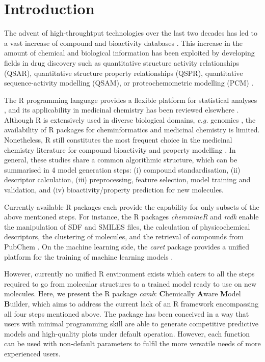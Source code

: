 \documentclass{bioinfo}
\begin{document}
\section{Introduction}

The advent of high-throughtput technologies over the last two decades 
has led to a vast increase of compound and bioactivity databases \citep{bender_databases,chembl,pubchem}.
This increase in the amount of chemical and biological information 
has been exploited by developing fields in drug discovery 
such as quantitative structure activity relationships (QSAR), quantitative structure property relationships (QSPR), quantitative sequence-activity modelling (QSAM), or proteochemometric modelling (PCM) \citep{review_pcm}.

The R programming language provides a flexible platform for statistical analyses \citep{Rlanguage},
and its applicability in medicinal chemistry has been reviewed elsewhere \citep{mente}.
Although R is extensively used in diverse biological domains, {\it e.g.} genomics \citep{bioconductor},
the availability of R packages for cheminformatics and medicinal chemistry is limited. %
Nonetheless, R still constitutes the most frequent choice in the medicinal chemistry literature
for compound bioactivity and property modelling \citep{mente}.
In general, these studies share a common algorithmic structure, which can be summarised in 4 model generation steps:
(i) compound standardisation, (ii) descriptor calculation,
(iii) preprocessing, feature selection, model training and validation, and (iv) bioactivity/property prediction for new molecules.

Currently available R packages each provide the capability for only subsets of the above mentioned steps.
For instance, the R packages {\it chemmineR} \citep{chemmineR} and {\it rcdk} \citep{rcdk} enable the manipulation of SDF and SMILES
files, the calculation of physicochemical descriptors, the clustering of molecules,
and the retrieval of compounds from PubChem \citep{pubchem}.
On the machine learning side, the {\it caret} package provides a
unified platform for the training of machine learning models \citep{caret}.

However, currently no unified R environment exists which caters to all the steps required to go from molecular structures to a trained model ready to use on new molecules.
Here, we present the R package {\it camb}: {\bf C}hemically {\bf A}ware {\bf M}odel {\bf B}uilder,
which aims to address the current lack of an R framework encompassing all four steps mentioned above.
The package has been conceived in a way that users with minimal
programming skill are able to generate competitive predictive models and high-quality plots
under default operation.
However, each function can be used with non-default parameters to fulfil the more versatile needs of more experienced users.
\end{document}
